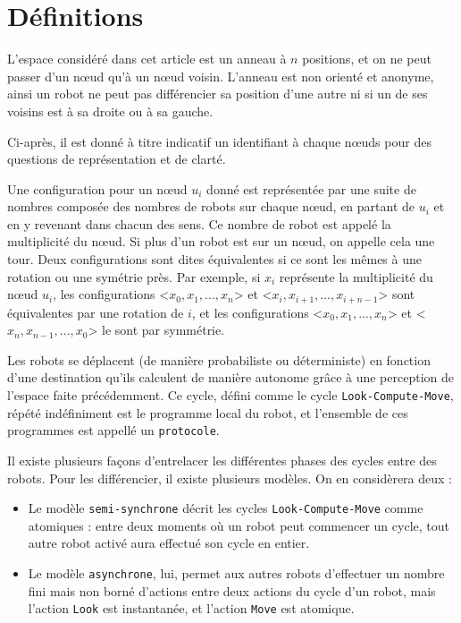 \documentclass[11pt,letter]{../../pactole-git/tex/llncs} %
\begin{document}
\section{Définitions}

L'espace considéré dans cet article est un anneau à $n$ positions, et on ne peut passer 
d'un nœud qu'à un nœud voisin. L'anneau est non orienté et anonyme, ainsi un robot ne peut pas
différencier sa position d'une autre ni si un de ses voisins est à sa droite ou à sa gauche.

Ci-après, il est donné à titre indicatif un identifiant à chaque nœuds pour des questions de 
représentation et de clarté.

Une configuration pour un nœud $u_{i}$ donné est représentée par une suite de nombres
composée des nombres de robots sur chaque nœud, en partant de $u_{i}$ et en y revenant
dans chacun des sens. 
Ce nombre de robot est appelé la multiplicité du nœud. 
Si plus d'un robot est sur un nœud, on appelle cela une tour.
Deux configurations sont dites équivalentes si ce sont les mêmes
à une rotation ou une symétrie près. Par exemple, si $x_i$ représente la multiplicité du
nœud $u_i$, les configurations
<$x_0 ,x_1,...,x_n$> et <$x_i ,x_{i+1},...,x_{i+n-1}$> sont équivalentes par une rotation de $i$,
et les configurations <$x_0 ,x_1,...,x_n$> et <$x_n ,x_{n-1},...,x_0$> le sont par symmétrie.

Les robots se déplacent (de manière probabiliste ou déterministe) en 
fonction d'une destination qu'ils calculent de manière autonome
grâce à une perception de l'espace faite précédemment. Ce cycle, défini comme le cycle
\lstinline{Look-Compute-Move}, répété indéfiniment est le 
programme local du robot, et l'ensemble de ces programmes est appellé un \lstinline{protocole}.

Il existe plusieurs façons d'entrelacer les différentes phases des cycles
entre des robots. Pour les différencier, il existe plusieurs modèles. On en considèrera deux :
\begin{itemize}
\item Le modèle \lstinline{semi-synchrone} décrit
les cycles \lstinline{Look-Compute-Move} comme atomiques : entre deux moments où un robot peut
commencer un cycle, tout autre robot activé aura effectué son cycle en entier.
\item  Le modèle \lstinline{asynchrone}, 
lui, permet aux autres robots d'effectuer un nombre fini mais non borné d'actions
entre deux actions du cycle d'un robot, mais l'action \lstinline{Look} 
est instantanée, et l'action \lstinline{Move} est atomique.
\end{itemize}
\end{document}
